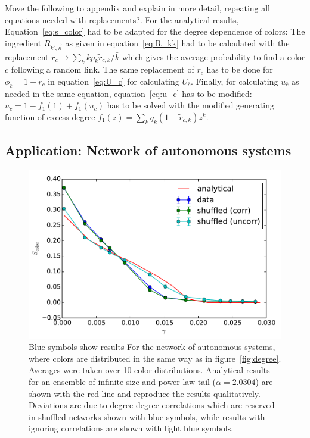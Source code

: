 \documentclass[aps, pre, onecolumn, a4paper, floatfix]{revtex4}
\begin{document}
{\color{red} Move the following to appendix and explain in more detail, repeating all equations needed with 
replacements?}. For the analytical results, 
Equation~\ref{eq:s_color} had to be adapted for the degree dependence of colors: 
The ingredient $R_{k',\vec \kappa}$ as given in equation~\ref{eq:R_kk} had to be calculated 
with the replacement $r_c \to \sum_k k p_k {\tilde r}_{c,k}/{\bar k}$ which gives the average probability 
to find a color $c$ following a random link. The same replacement of $r_c$ has to be done for 
$\phi_{\bar c}=1-r_c$ in equation~\ref{eq:U_c} for calculating $U_{\bar c}$. Finally, for calculating 
$u_{\bar c}$ as needed in the same equation, equation~\ref{eq:u_c} has to be modified: 
$u_{\bar c} = 1- f_1(1) +  f_1(u_{\bar c})$ has to be solved with the modified generating function 
of excess degree $f_1(z)=\sum_k q_k (1-{\tilde r}_{c,k}) z^k$.


\subsection{Application: Network of autonomous systems}

\begin{figure}[htb]
\begin{center}
    \includegraphics[width=0.6\columnwidth]{S_color_data_degree_dependent.pdf}
    \caption{Blue symbols show results For the network of autonomous systems, where colors are 
    distributed in the same way as in figure~\ref{fig:degree}. Averages were taken over 10 color 
    distributions. Analytical results for an ensemble of infinite size and power law tail 
    ($\alpha=2.0304$) are shown with the red line and reproduce the results qualitatively. 
    Deviations are due to degree-degree-correlations which are reserved in shuffled networks shown 
    with blue symbols, while results with ignoring correlations are shown with light blue symbols.}
    \label{fig:as}
\end{center}
\end{figure}
\end{document}
